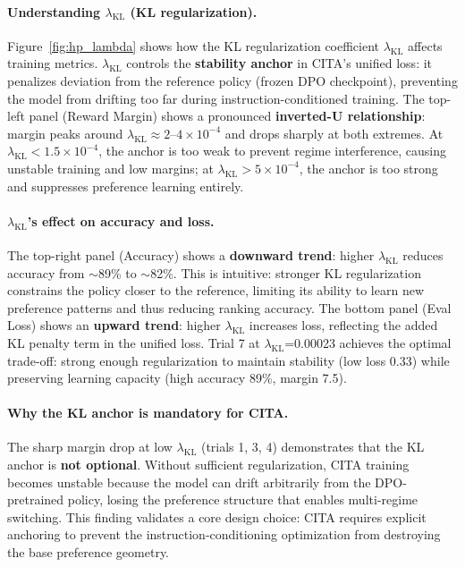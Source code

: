 \paragraph{Understanding $\lambda_{\text{KL}}$ (KL regularization).}
Figure~\ref{fig:hp_lambda} shows how the KL regularization coefficient $\lambda_{\text{KL}}$ affects training metrics.
$\lambda_{\text{KL}}$ controls the \textbf{stability anchor} in \textsc{CITA}'s unified loss: it penalizes deviation from the reference policy (frozen DPO checkpoint), preventing the model from drifting too far during instruction-conditioned training.
The top-left panel (Reward Margin) shows a pronounced \textbf{inverted-U relationship}: margin peaks around $\lambda_{\text{KL}} \approx 2$--$4 \times 10^{-4}$ and drops sharply at both extremes.
At $\lambda_{\text{KL}} < 1.5 \times 10^{-4}$, the anchor is too weak to prevent regime interference, causing unstable training and low margins; at $\lambda_{\text{KL}} > 5 \times 10^{-4}$, the anchor is too strong and suppresses preference learning entirely.

\paragraph{$\lambda_{\text{KL}}$'s effect on accuracy and loss.}
The top-right panel (Accuracy) shows a \textbf{downward trend}: higher $\lambda_{\text{KL}}$ reduces accuracy from $\sim$89\% to $\sim$82\%.
This is intuitive: stronger KL regularization constrains the policy closer to the reference, limiting its ability to learn new preference patterns and thus reducing ranking accuracy.
The bottom panel (Eval Loss) shows an \textbf{upward trend}: higher $\lambda_{\text{KL}}$ increases loss, reflecting the added KL penalty term in the unified loss.
Trial 7 at $\lambda_{\text{KL}}$=0.00023 achieves the optimal trade-off: strong enough regularization to maintain stability (low loss 0.33) while preserving learning capacity (high accuracy 89\%, margin 7.5).

\paragraph{Why the KL anchor is mandatory for \textsc{CITA}.}
The sharp margin drop at low $\lambda_{\text{KL}}$ (trials 1, 3, 4) demonstrates that the KL anchor is \textbf{not optional}.
Without sufficient regularization, \textsc{CITA} training becomes unstable because the model can drift arbitrarily from the DPO-pretrained policy, losing the preference structure that enables multi-regime switching.
This finding validates a core design choice: \textsc{CITA} requires explicit anchoring to prevent the instruction-conditioning optimization from destroying the base preference geometry.

